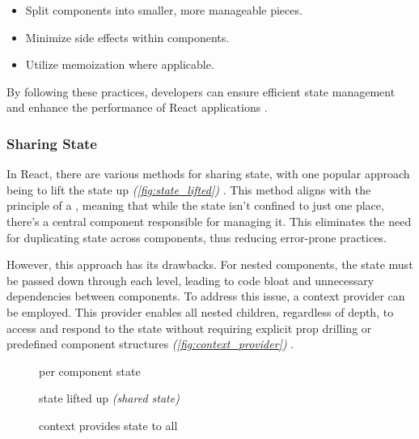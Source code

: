 \begin{itemize}
    \item Split components into smaller, more manageable pieces.
    \item Minimize side effects within components.
    \item Utilize memoization where applicable.
\end{itemize}

By following these practices, developers can ensure efficient state management and enhance the performance of React applications \cite{enwiki:pure_function}.

\subsubsection{Sharing State}

In React, there are various methods for sharing state, with one popular approach being to lift the state up \textit{(\autoref{fig:state_lifted})} \cite{react:sharing_state}. This method aligns with the principle of a  \cite{enwiki:single_source_of_truth}, meaning that while the state isn't confined to just one place, there's a central component responsible for managing it. This eliminates the need for duplicating state across components, thus reducing error-prone practices.

However, this approach has its drawbacks. For nested components, the state must be passed down through each level, leading to code bloat and unnecessary dependencies between components. To address this issue, a context provider can be employed. This provider enables all nested children, regardless of depth, to access and respond to the state without requiring explicit prop drilling or predefined component structures \textit{(\autoref{fig:context_provider})} \cite{react:passing_data_deeply_with_context}.

\begin{figure}[ht]
    \centering
    \begin{minipage}[t]{0.3\textwidth}
        \centering
        
        \caption{per component state}
        \label{fig:state_regular}
    \end{minipage}
    \hfill
    \begin{minipage}[t]{0.3\textwidth}
        \centering
        
        \caption{state lifted up \textit{(shared state)}}
        \label{fig:state_lifted}
    \end{minipage}
    \hfill
    \begin{minipage}[t]{0.3\textwidth}
        \centering
        
        \caption{context provides state to all}
        \label{fig:context_provider}
    \end{minipage}
\end{figure}

